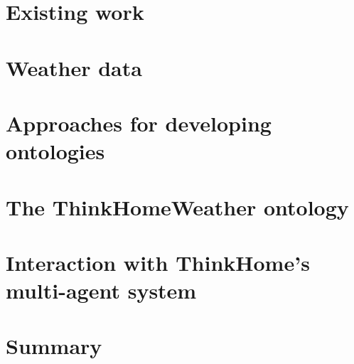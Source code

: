 \documentclass[a4paper,11pt,twoside]{memoir}
\begin{document}
\chapter{Existing work}
\label{ch:existing_work}


\chapter{Weather data}
\label{ch:weather_data}


\chapter{Approaches for developing ontologies}
\label{ch:development_approaches}


\chapter{The ThinkHomeWeather ontology}
\label{ch:thinkhomeweather_ontology}


\chapter{Interaction with ThinkHome's multi-agent system}
\label{ch:interaction}


\chapter{Summary}
\label{ch:summary}
















\appendix



\end{document}
